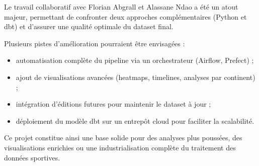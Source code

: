 \documentclass[12pt,a4paper]{article}
\begin{document}
Le travail collaboratif avec Florian Abgrall et Alassane Ndao a été un atout majeur, permettant de confronter deux approches complémentaires (Python et dbt) et d’assurer une qualité optimale du dataset final.

Plusieurs pistes d’amélioration pourraient être envisagées :

\begin{itemize}
    \item automatisation complète du pipeline via un orchestrateur (Airflow, Prefect) ;
    \item ajout de visualisations avancées (heatmaps, timelines, analyses par continent) ;
    \item intégration d’éditions futures pour maintenir le dataset à jour ;
    \item déploiement du modèle dbt sur un entrepôt cloud pour faciliter la scalabilité.
\end{itemize}

Ce projet constitue ainsi une base solide pour des analyses plus poussées, des visualisations enrichies ou une industrialisation complète du traitement des données sportives.
\end{document}
